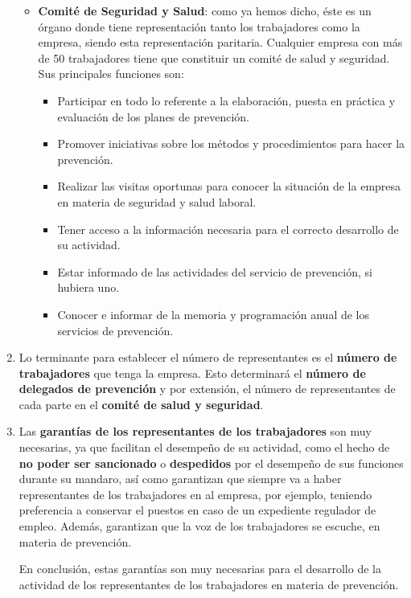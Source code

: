 \begin{enumerate}[label=\alph*.]
\begin{itemize}
        \item \textbf{Comité de Seguridad y Salud}: como ya hemos dicho, éste es un órgano donde tiene representación tanto los trabajadores como la empresa, siendo esta representación paritaria. Cualquier empresa con más de 50 trabajadores tiene que constituir un comité de salud y seguridad. Sus principales funciones son:
        \begin{itemize}
            \item Participar en todo lo referente a la elaboración, puesta en práctica y evaluación de los planes de prevención.
            \item Promover iniciativas sobre los métodos y procedimientos para hacer la prevención.
            \item Realizar las visitas oportunas para conocer la situación de la empresa en materia de seguridad y salud laboral.
            \item Tener acceso a la información necesaria para el correcto desarrollo de su actividad.
            \item Estar informado de las actividades del servicio de prevención, si hubiera uno.
            \item Conocer e informar de la memoria y programación anual de los servicios de prevención.
        \end{itemize}
    \end{itemize}

    \item Lo terminante para establecer el número de representantes es el \textbf{número de trabajadores} que tenga la empresa. Esto determinará el \textbf{número de delegados de prevención} y por extensión, el número de representantes de cada parte en el \textbf{comité de salud y seguridad}.

    \item Las \textbf{garantías de los representantes de los trabajadores} son muy necesarias, ya que facilitan el desempeño de su actividad, como el hecho de \textbf{no poder ser sancionado} o \textbf{despedidos} por el desempeño de sus funciones durante su mandaro, así como garantizan que siempre va a haber representantes de los trabajadores en al empresa, por ejemplo, teniendo preferencia a conservar el puestos en caso de un expediente regulador de empleo. Además, garantizan que la voz de los trabajadores se escuche, en materia de prevención.

    En conclusión, estas garantías son muy necesarias para el desarrollo de la actividad de los representantes de los trabajadores en materia de prevención.


\end{enumerate}
